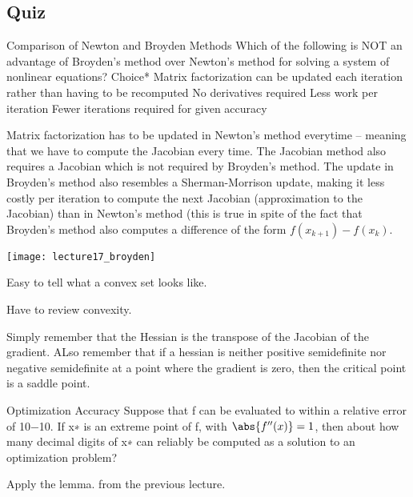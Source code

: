 \documentclass[../main.tex]{subfiles}
\begin{document}
\subsection{Quiz}

Comparison of Newton and Broyden Methods
Which of the following is NOT an advantage of Broyden's method over Newton's method for solving a system of nonlinear equations?
Choice*
Matrix factorization can be updated each iteration rather than having to be recomputed
No derivatives required
Less work per iteration
Fewer iterations required for given accuracy

\begin{solution}
    Matrix factorization has to be updated in Newton's method everytime -- meaning that
    we have to compute the Jacobian every time. The Jacobian method also requires a Jacobian
    which is not required by Broyden's method. The update in Broyden's method also resembles
    a Sherman-Morrison update, making it less costly per iteration to compute the next Jacobian (approximation to the Jacobian) than in Newton's method (this is true in spite of the fact
    that Broyden's method also computes a difference of the form $f(x_{k+1}) - f(x_{k})$.
\begin{center}
    \texttt{[image: lecture17\_broyden]}
\end{center}
\end{solution}


Easy to tell what a convex set looks like.


Have to review convexity.


Simply remember that the Hessian is the transpose of the Jacobian of the gradient. ALso remember that if a hessian is neither positive semidefinite nor negative semidefinite at a point where the gradient is zero, then the critical point is a saddle point. 

Optimization Accuracy
Suppose that f can be evaluated to within a relative error of 10−10. If x∗ is an extreme point of f, with $\abs{f''(x)} = 1$, then about how many decimal digits of x∗ can reliably be computed as a solution to an optimization problem?

\begin{solution}
    Apply the lemma. from the previous lecture.
\end{solution}
\end{document}
